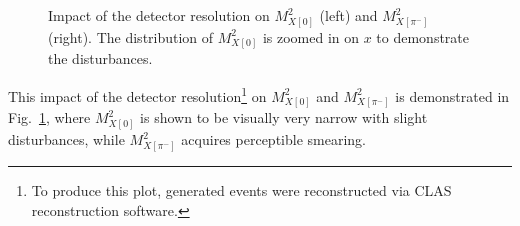 \begin{figure}[htp]
\begin{center}
\caption{\small Impact of the detector resolution on $M_{X[0]}^{2}$ (left) and $M_{X[\pi^{-}]}^{2}$ (right). The distribution of $M_{X[0]}^{2}$ is zoomed in on $x$ to demonstrate the disturbances.} \label{fig:mm_res}
\end{center}
\end{figure}
\vspace{-1.5em}

This impact of the detector resolution\footnote[4]{To produce this plot, generated events were reconstructed via CLAS reconstruction software.} on $M_{X[0]}^{2}$ and $M_{X[\pi^{-}]}^{2}$ is demonstrated in Fig.~\ref{fig:mm_res}, where $M_{X[0]}^{2}$ is shown to be visually very narrow with slight disturbances, while $M_{X[\pi^{-}]}^{2}$ acquires perceptible smearing. 


\vspace{-0.75em}
